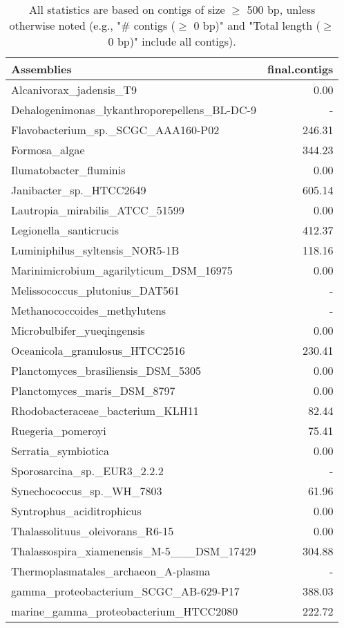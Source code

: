 \documentclass[12pt,a4paper]{article}
\begin{document}
\begin{table}[ht]
\begin{center}
\caption{All statistics are based on contigs of size $\geq$ 500 bp, unless otherwise noted (e.g., "\# contigs ($\geq$ 0 bp)" and "Total length ($\geq$ 0 bp)" include all contigs).}
\begin{tabular}{|l*{1}{|r}|}
\hline
Assemblies & final.contigs \\ \hline
Alcanivorax\_jadensis\_T9 & 0.00 \\ \hline
Dehalogenimonas\_lykanthroporepellens\_BL-DC-9 & - \\ \hline
Flavobacterium\_sp.\_SCGC\_AAA160-P02 & 246.31 \\ \hline
Formosa\_algae & 344.23 \\ \hline
Ilumatobacter\_fluminis & 0.00 \\ \hline
Janibacter\_sp.\_HTCC2649 & 605.14 \\ \hline
Lautropia\_mirabilis\_ATCC\_51599 & 0.00 \\ \hline
Legionella\_santicrucis & 412.37 \\ \hline
Luminiphilus\_syltensis\_NOR5-1B & 118.16 \\ \hline
Marinimicrobium\_agarilyticum\_DSM\_16975 & 0.00 \\ \hline
Melissococcus\_plutonius\_DAT561 & - \\ \hline
Methanococcoides\_methylutens & - \\ \hline
Microbulbifer\_yueqingensis & 0.00 \\ \hline
Oceanicola\_granulosus\_HTCC2516 & 230.41 \\ \hline
Planctomyces\_brasiliensis\_DSM\_5305 & 0.00 \\ \hline
Planctomyces\_maris\_DSM\_8797 & 0.00 \\ \hline
Rhodobacteraceae\_bacterium\_KLH11 & 82.44 \\ \hline
Ruegeria\_pomeroyi & 75.41 \\ \hline
Serratia\_symbiotica & 0.00 \\ \hline
Sporosarcina\_sp.\_EUR3\_2.2.2 & - \\ \hline
Synechococcus\_sp.\_WH\_7803 & 61.96 \\ \hline
Syntrophus\_aciditrophicus & 0.00 \\ \hline
Thalassolituus\_oleivorans\_R6-15 & 0.00 \\ \hline
Thalassospira\_xiamenensis\_M-5\_\_\_DSM\_17429 & 304.88 \\ \hline
Thermoplasmatales\_archaeon\_A-plasma & - \\ \hline
gamma\_proteobacterium\_SCGC\_AB-629-P17 & 388.03 \\ \hline
marine\_gamma\_proteobacterium\_HTCC2080 & 222.72 \\ \hline
\end{tabular}
\end{center}
\end{table}
\end{document}
